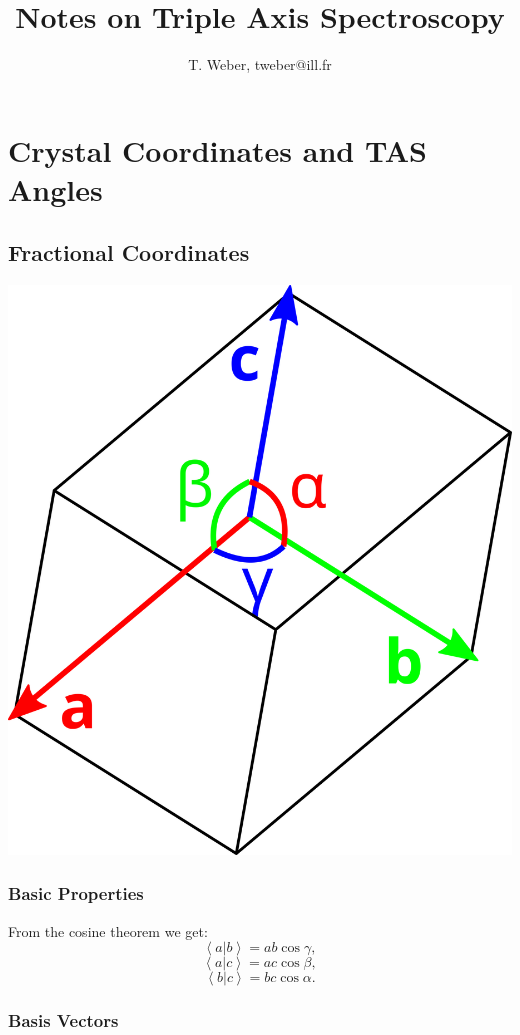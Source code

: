 \documentclass[english]{book}
\begin{document}
\title{Notes on Triple Axis Spectroscopy}
\author{T. Weber, tweber@ill.fr}
\maketitle
\tableofcontents




\chapter{Crystal Coordinates and TAS Angles}


\section{Fractional Coordinates}

\begin{center}
	\includegraphics[width = 0.2 \textwidth]{cell}
\end{center}

\subsection*{Basic Properties}

From the cosine theorem we get:
\begin{equation} \left< a | b \right > = ab \cos \gamma, \label{ab} \end{equation}
\begin{equation} \left< a | c \right > = ac \cos \beta, \label{ac} \end{equation}
\begin{equation} \left< b | c \right > = bc \cos \alpha. \label{bc} \end{equation}


\subsection*{Basis Vectors}
\end{document}
